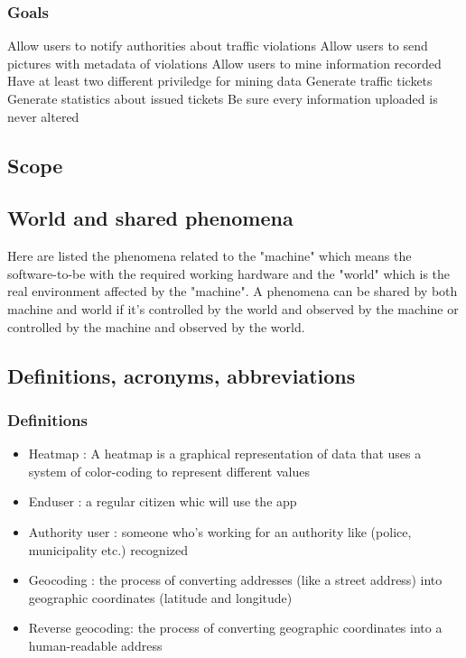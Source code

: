 \subsubsection{Goals}
\begin{enumerate}
   Allow users to notify authorities about traffic violations
   Allow users to send pictures with metadata of violations
   Allow users to mine information recorded
   Have at least two different  priviledge for mining data
   Generate traffic tickets
   Generate statistics about issued tickets
   Be sure every information uploaded is never altered
\end{enumerate}


\subsection{Scope}

\subsection{World and shared phenomena}

Here are listed the phenomena related to the "machine" which means the software-to-be with the required working  hardware and the "world" which is the real environment affected by the "machine".
A phenomena can be shared by both machine and world if it's controlled by the world and observed by the machine or controlled by the machine and observed by the world.




\subsection{Definitions,  acronyms,  abbreviations}

\subsubsection{Definitions}
\begin{itemize}
  \item{Heatmap} : A heatmap is a graphical representation of data that uses a system of color-coding to represent different values
  \item Enduser : a regular citizen whic will use the app
  \item Authority user : someone who's working for an authority like (police, municipality etc.) recognized
  \item Geocoding : the process of converting addresses (like a street address) into geographic coordinates (latitude and longitude)
  \item Reverse geocoding:  the process of converting geographic coordinates into a human-readable address

\end{itemize}

